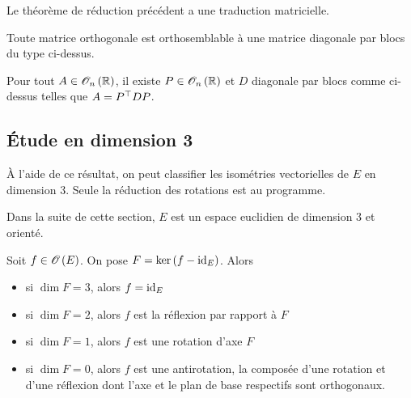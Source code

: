 Le théorème de réduction précédent a une traduction matricielle.

\begin{theo}
Toute matrice orthogonale est orthosemblable à une matrice diagonale par blocs du type ci-dessus.

Pour tout \(A\in\Orth{n}[\R]\), il existe \(P\in\Orth{n}[\R]\) et \(D\) diagonale par blocs comme ci-dessus telles que \(A=P^{\top}DP\).
\end{theo}

\subsection{Étude en dimension 3}

À l'aide de ce résultat, on peut classifier les isométries vectorielles de \(E\) en dimension \(3\). Seule la réduction des rotations est au programme.

Dans la suite de cette section, \(E\) est un espace euclidien de dimension \(3\) et orienté.

\begin{prop}
Soit \(f\in\Orth{}[E]\). On pose \(F=\ker\left(f-\mathrm{id}_{E}\right)\). Alors

\begin{itemize}
    \item si \(\dim F=3\), alors \(f=\mathrm{id}_{E}\) \\
    \item si \(\dim F=2\), alors \(f\) est la réflexion par rapport à \(F\) \\
    \item si \(\dim F=1\), alors \(f\) est une rotation d'axe \(F\) \\
    \item si \(\dim F=0\), alors \(f\) est une antirotation, \cad la composée d'une rotation et d'une réflexion dont l'axe et le plan de base respectifs sont orthogonaux.
\end{itemize}
\end{prop}

